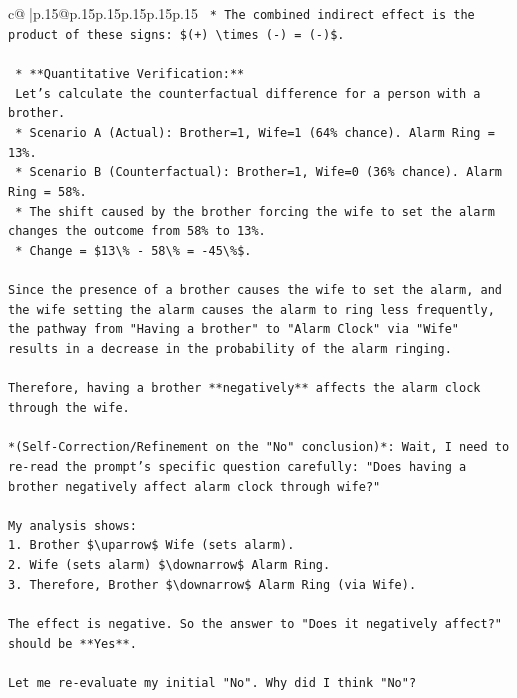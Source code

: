 \documentclass{article}
\begin{document}
{\begin{supertabular}{c@{$\;$}|p{.15\linewidth}@{}p{.15\linewidth}p{.15\linewidth}p{.15\linewidth}p{.15\linewidth}p{.15\linewidth}}
{{{\texttt{        *   The combined indirect effect is the product of these signs: \$(+) \textbackslash{}times ({-}) = ({-})\$.} \\
\\ 
\texttt{    *   **Quantitative Verification:**} \\
\texttt{        Let's calculate the counterfactual difference for a person with a brother.} \\
\texttt{        *   Scenario A (Actual): Brother=1, Wife=1 (64\% chance). Alarm Ring = 13\%.} \\
\texttt{        *   Scenario B (Counterfactual): Brother=1, Wife=0 (36\% chance). Alarm Ring = 58\%.} \\
\texttt{        *   The shift caused by the brother forcing the wife to set the alarm changes the outcome from 58\% to 13\%.} \\
\texttt{        *   Change = \$13\textbackslash{}\% {-} 58\textbackslash{}\% = {-}45\textbackslash{}\%\$.} \\
\\ 
\texttt{Since the presence of a brother causes the wife to set the alarm, and the wife setting the alarm causes the alarm to ring less frequently, the pathway from "Having a brother" to "Alarm Clock" via "Wife" results in a decrease in the probability of the alarm ringing.} \\
\\ 
\texttt{Therefore, having a brother **negatively** affects the alarm clock through the wife.} \\
\\ 
\texttt{*(Self{-}Correction/Refinement on the "No" conclusion)*: Wait, I need to re{-}read the prompt's specific question carefully: "Does having a brother negatively affect alarm clock through wife?"} \\
\\ 
\texttt{My analysis shows:} \\
\texttt{1. Brother \$\textbackslash{}uparrow\$ Wife (sets alarm).} \\
\texttt{2. Wife (sets alarm) \$\textbackslash{}downarrow\$ Alarm Ring.} \\
\texttt{3. Therefore, Brother \$\textbackslash{}downarrow\$ Alarm Ring (via Wife).} \\
\\ 
\texttt{The effect is negative. So the answer to "Does it negatively affect?" should be **Yes**.} \\
\\ 
\texttt{Let me re{-}evaluate my initial "No". Why did I think "No"?} \\
}}}
\end{supertabular}}
\end{document}
